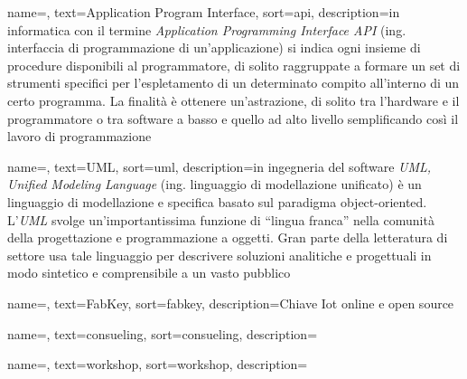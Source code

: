 
\renewcommand{\acronymname}{Acronimi e abbreviazioni}



\renewcommand{\glossaryname}{Glossario}

{
    name=,
    text=Application Program Interface,
    sort=api,
    description={in informatica con il termine \emph{Application Programming Interface API} (ing. interfaccia di programmazione di un'applicazione) si indica ogni insieme di procedure disponibili al programmatore, di solito raggruppate a formare un set di strumenti specifici per l'espletamento di un determinato compito all'interno di un certo programma. La finalità è ottenere un'astrazione, di solito tra l'hardware e il programmatore o tra software a basso e quello ad alto livello semplificando così il lavoro di programmazione}
}

{
    name=,
    text=UML,
    sort=uml,
    description={in ingegneria del software \emph{UML, Unified Modeling Language} (ing. linguaggio di modellazione unificato) è un linguaggio di modellazione e specifica basato sul paradigma object-oriented. L'\emph{UML} svolge un'importantissima funzione di ``lingua franca'' nella comunità della progettazione e programmazione a oggetti. Gran parte della letteratura di settore usa tale linguaggio per descrivere soluzioni analitiche e progettuali in modo sintetico e comprensibile a un vasto pubblico}
}

{
    name=,
    text=FabKey,
    sort=fabkey,
    description={Chiave Iot online e open source}
}

{
	name=,
    text=consueling,
    sort=consueling,
    description={}
}

{
	name=,
    text=workshop,
    sort=workshop,
    description={}
}

